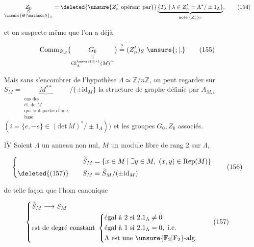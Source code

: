 \[
 \underset{\substack{\cap\\ \unsure{\mathfrak S|\mathscr S}_S}}{Z_0}
 =\deleted{\unsure{Z'_n\ \text{opérant par}}}
 \underbrace{\{T_\lambda\mid\lambda\in{Z'_n}=\Lambda^*/\pm1_\Lambda\}}_{\text{noté }(Z'_n)_S},
 \tag*{(154)}
\]

et on suspecte même que l'on a déjà

\[
 \operatorname{Comm}_{\mathfrak S_S}
 \bigl(\underset{\substack{\Vert\\{\mathrm{Gl}}^{\unsure{1|\prime}}_\Lambda(M)^\pm}}{G_0}\bigr)
 \overset{?}{=}(Z'_n)_S\ \unsure{;|.}
 \tag*{(155)}
\]

Mais sans s'encombrer de l'hypothèse $\Lambda\simeq\mathbb Z/n\mathbb Z$, on peut regarder sur $S_M=\underbrace{M^{**}}_{\substack{\text{ens des}\\\text{él. de }M\\\text{qui font partie d'une}\\\text{base}}}/\{\pm\mathrm{id}_M\}$ la structure de graphe définie par $A_{M,i}$ $(i=\{e,-e\}\in(\text{det}\,M)^*/\pm1_\Lambda))$ et les groupes $G_0,Z_0$ associés.


$\underline{\overline{\mathrm{IV}}}$ Soient  $\Lambda$ un anneau non nul, $M$ un module libre de rang 2 sur $\Lambda$,

\[
 \left\{\begin{aligned}
 \widetilde S_M&=\{x\in M\mid\exists y\in M,\ (x,y)\in\operatorname{Rep}(M)\}\\
 \deleted{\text{(157)}}\qquad S_M&=\widetilde S_M/(\pm\mathrm{id}_M)
 \end{aligned}\right.
 \tag*{(156)}
\]

de telle façon que l'hom canonique

\[
 \left\{\begin{aligned}
 &\widetilde S_M\longrightarrow S_M\\
 &\text{est de degré constant }\left\{\begin{aligned}
 &\text{égal à }2\text{ si }2.1_\Lambda\ne0\\
 &\text{égal à }1\text{ si }2.1_\Lambda=0,\ \text{i.e.}\\
 &\Lambda\text{ est une }\unsure{\mathbb F_2|\mathrm F_2}\text{-alg.}
 \end{aligned}\right.
 \end{aligned}\right.
 \tag*{(157)}
\]


